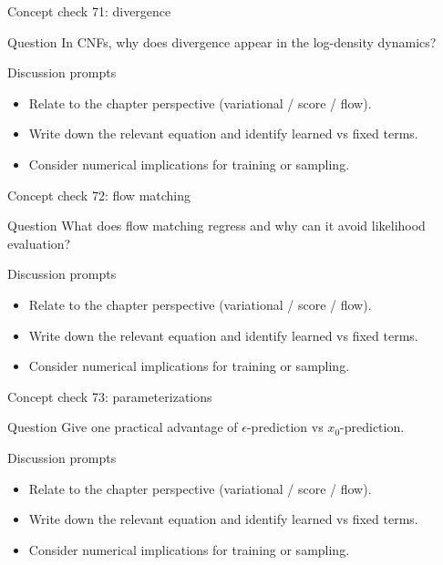\documentclass[aspectratio=169]{beamer}
\begin{document}
\begin{frame}{Concept check 71: divergence}
\begin{block}{Question}
In CNFs, why does divergence appear in the log-density dynamics?
\end{block}
\begin{block}{Discussion prompts}
\begin{itemize}
\item Relate to the chapter perspective (variational / score / flow).
\item Write down the relevant equation and identify learned vs fixed terms.
\item Consider numerical implications for training or sampling.
\end{itemize}
\end{block}
\end{frame}

\begin{frame}{Concept check 72: flow matching}
\begin{block}{Question}
What does flow matching regress and why can it avoid likelihood evaluation?
\end{block}
\begin{block}{Discussion prompts}
\begin{itemize}
\item Relate to the chapter perspective (variational / score / flow).
\item Write down the relevant equation and identify learned vs fixed terms.
\item Consider numerical implications for training or sampling.
\end{itemize}
\end{block}
\end{frame}

\begin{frame}{Concept check 73: parameterizations}
\begin{block}{Question}
Give one practical advantage of \(\epsilon\)-prediction vs \(x_0\)-prediction.
\end{block}
\begin{block}{Discussion prompts}
\begin{itemize}
\item Relate to the chapter perspective (variational / score / flow).
\item Write down the relevant equation and identify learned vs fixed terms.
\item Consider numerical implications for training or sampling.
\end{itemize}
\end{block}
\end{frame}
\end{document}

